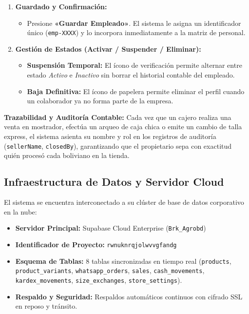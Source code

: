 \documentclass[11pt,a4paper]{article}
\begin{document}
\begin{propbox}
\begin{enumerate}
    \item \textbf{Guardado y Confirmación:}
    \begin{itemize}
        \item Presione \textbf{«Guardar Empleado»}. El sistema le asigna un identificador único (\texttt{emp-XXXX}) y lo incorpora inmediatamente a la matriz de personal.
    \end{itemize}

    \item \textbf{Gestión de Estados (Activar / Suspender / Eliminar):}
    \begin{itemize}
        \item \textbf{Suspensión Temporal:} El ícono de verificación permite alternar entre estado \textit{Activo} e \textit{Inactivo} sin borrar el historial contable del empleado.
        \item \textbf{Baja Definitiva:} El ícono de papelera permite eliminar el perfil cuando un colaborador ya no forma parte de la empresa.
    \end{itemize}
\end{enumerate}
\end{propbox}

\begin{highlightbox}
\textbf{Trazabilidad y Auditoría Contable:} Cada vez que un cajero realiza una venta en mostrador, efectúa un arqueo de caja chica o emite un cambio de talla express, el sistema asienta su nombre y rol en los registros de auditoría (\texttt{sellerName}, \texttt{closedBy}), garantizando que el propietario sepa con exactitud quién procesó cada boliviano en la tienda.
\end{highlightbox}

\subsection{Infraestructura de Datos y Servidor Cloud}
El sistema se encuentra interconectado a su clúster de base de datos corporativo en la nube:
\begin{itemize}
    \item \textbf{Servidor Principal:} Supabase Cloud Enterprise (\texttt{Brk\_Agrobd})
    \item \textbf{Identificador de Proyecto:} \texttt{rwnuknrqjolwvvgfandg}
    \item \textbf{Esquema de Tablas:} 8 tablas sincronizadas en tiempo real (\texttt{products}, \texttt{product\_variants}, \texttt{whatsapp\_orders}, \texttt{sales}, \texttt{cash\_movements}, \texttt{kardex\_movements}, \texttt{size\_exchanges}, \texttt{store\_settings}).
    \item \textbf{Respaldo y Seguridad:} Respaldos automáticos continuos con cifrado SSL en reposo y tránsito.
\end{itemize}
\end{document}
